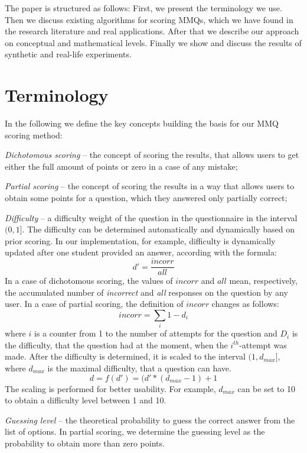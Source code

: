 The paper is structured as follows:
First, we present the terminology we use.
Then we discuss existing algorithms for scoring MMQs, which we have found in the research literature and real applications.
After that we describe our approach on conceptual and mathematical levels.
Finally we show and discuss the results of synthetic and real-life experiments.

\section{Terminology} %
\label{sec:termin}

In the following we define the key concepts building the basis for our MMQ scoring method:

\textit{Dichotomous scoring} -- the concept of scoring the results, that allows users to get either the full amount of points or zero in a case of any mistake;

\textit{Partial scoring} -- the concept of scoring the results in a way that allows users to obtain some points for a question, which they answered only partially correct;

\textit{Difficulty} -- a difficulty weight of the question in the questionnaire in the interval $(0,1]$.
The difficulty can be determined automatically and dynamically based on prior scoring.
In our implementation, for example, difficulty is dynamically updated after one student provided an answer, according with the formula: 
	\[d' = \frac{incorr}{all}\]
In a case of dichotomous scoring, the values of $incorr$ and $all$ mean, respectively, the accumulated number of \textit{incorrect} and \textit{all} responses on the question by any user.
In a case of partial scoring, the definition of $incorr$ changes as follows:
	\[incorr = \sum_{i}1-d_{i}\]
where $i$ is a counter from 1 to the number of attempts for the question and
$D_{i}$ is the difficulty, that the question had at the moment, when the $i^{th}$-attempt was made.
After the difficulty is determined, it is scaled to the interval $(1,d_{max}]$, where $d_{max}$ is the maximal difficulty, that a question can have.
	\[d = f(d') = (d' *(d_{max}-1)+1 \]
The scaling is performed for better usability.
For example, $d_{max}$ can be set to 10 to obtain a difficulty level between 1 and 10.

\textit{Guessing level} -- the theoretical probability to guess the correct answer from the list of options.
In partial scoring, we determine the guessing level as the probability to obtain more than zero points.

